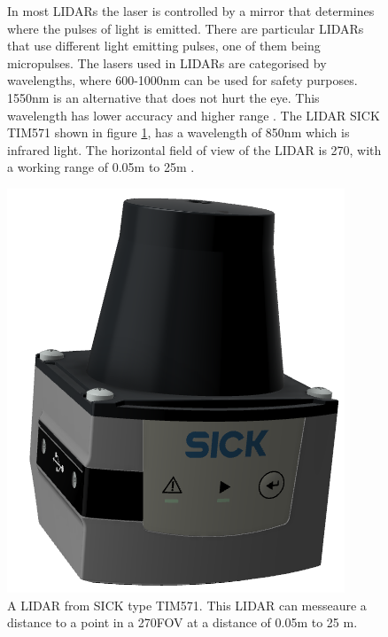 \begin{figure}[H]
    \centering
    \begin{minipage}[b]{0.64\linewidth}
        In most LIDARs the laser is controlled by a mirror that determines where the pulses of light is emitted. There are particular LIDARs that use different light emitting pulses, one of them being  micropulses. The lasers used in LIDARs are categorised by wavelengths, where 600-1000nm can be used for safety purposes. 1550nm is an alternative that does not hurt the eye. This wavelength has lower accuracy and higher range \cite{Lidarwork}.
        The LIDAR SICK TIM571 shown in figure \ref{fig:sicktim571}, has a wavelength of 850nm which is infrared light. The horizontal field of view of the LIDAR is 270\degree, with a working range of 0.05m to 25m \cite{2dlidar}.
    \end{minipage}
    \hspace{0.2cm}
    \begin{minipage}[b]{0.33\linewidth}
        \centering
    \includegraphics[width=\textwidth]{figures/TIM571-LIDAR.png}
    \caption{A LIDAR from SICK type TIM571. This LIDAR can messeaure a distance to a point in a 270\degree FOV at a distance of 0.05m to 25 m. \cite{2dlidar} }
    \label{fig:sicktim571}
    \end{minipage}
\end{figure}
